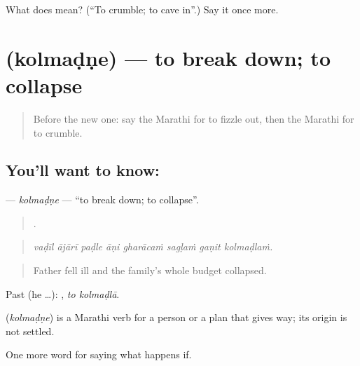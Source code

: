 \begin{tcolorbox}[breakable,colback=teal!4,colframe=teal!35!black,title={Before you move on}]
What does  mean? (\textquotedblleft{}To crumble; to cave in\textquotedblright{}.) Say it once more.
\end{tcolorbox}
\section[\texorpdfstring{\mr{कोलमडणे} (kolmaḍṇe)}{कोलमडणे (kolmaḍṇe)}]{ (kolmaḍṇe) — to break down; to collapse}

\label{lesson:MR-C552-kolmadne}



\begin{quote}
Before the new one: say the Marathi for to fizzle out, then the Marathi for to crumble.
\end{quote}

\subsection*{You'll want to know: }
\textbf{} — \emph{kolmaḍṇe} — \textquotedblleft{}to break down; to collapse\textquotedblright{}.

\begin{quote}
       .
\end{quote}

\begin{quote}
\emph{vaḍīl ājārī paḍle āṇi gharācaṁ sagḷaṁ gaṇit kolmaḍlaṁ.}
\end{quote}

\begin{quote}
Father fell ill and the family's whole budget collapsed.
\end{quote}

Past (he …):  , \emph{to kolmaḍlā}.

\begin{cousinweb}
\textbf{} (\emph{kolmaḍṇe}) is a Marathi verb for a person or a plan that gives way; its origin is not settled.
\end{cousinweb}

\begin{grammarlens}[title={What you've built}]
One more word for saying what happens if.
\end{grammarlens}

